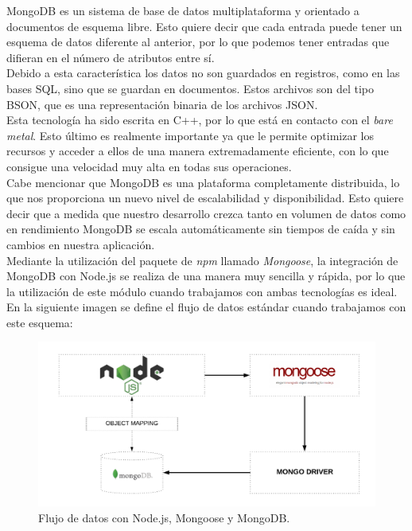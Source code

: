 MongoDB es un sistema de base de datos multiplataforma y orientado a documentos de esquema libre.
Esto quiere decir que cada entrada puede tener un esquema de datos diferente al anterior, por
lo que podemos tener entradas que difieran en el número de atributos entre sí.\\

Debido a esta característica los datos no son guardados en registros, como en las bases SQL, 
sino que se guardan en documentos. Estos archivos son del tipo BSON, que es una representación
binaria de los archivos JSON.\\

Esta tecnología ha sido escrita en C++, por lo que está en contacto con el \textit{bare metal}. Esto
último es realmente importante ya que le permite optimizar los recursos y acceder a ellos de una 
manera extremadamente eficiente, con lo que consigue una velocidad muy alta en todas sus operaciones.\\

Cabe mencionar que MongoDB es una plataforma completamente distribuida, lo que nos proporciona 
un nuevo nivel de escalabilidad y disponibilidad. Esto quiere decir que a medida que nuestro desarrollo
crezca tanto en volumen de datos como en rendimiento MongoDB se escala automáticamente sin tiempos
de caída y sin cambios en nuestra aplicación.\\

Mediante la utilización del paquete de \textit{npm} llamado \textit{Mongoose}\cite{mongoose}, la integración de MongoDB
con Node.js se realiza de una manera muy sencilla y rápida, por lo que la utilización de este módulo
cuando trabajamos con ambas tecnologías es ideal. En la siguiente imagen se define el flujo de datos
estándar cuando trabajamos con este esquema:

\begin{figure}[H]
	\centering
	\includegraphics[scale=0.28]{imagenes/node-mongo.png}
	\caption{Flujo de datos con Node.js, Mongoose y MongoDB. \label{fig:figura5}}
\end{figure}


